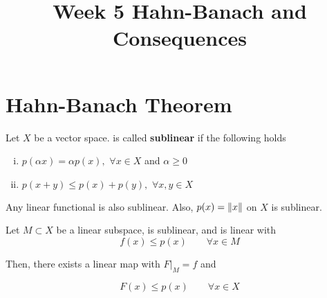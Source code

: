 \documentclass{article}
\title{Week 5 Hahn-Banach and Consequences}
\begin{document}
\author{\aut}
\maketitle

\section{Hahn-Banach Theorem} 

\begin{definition}\nl
\label{sublinear map}
	Let $X$ be a vector space.  is called \textbf{sublinear} if the following holds
	\begin{enumerate}[i)]
		\item $p( \alpha x)= \alpha p(x),$ $\forall x\in X$ and $\alpha\geq0$
		\item $p(x+y) \leq p(x)+p(y),\,\,\forall x,y\in X$
	\end{enumerate}
\end{definition}

\begin{example}
    Any linear functional is also sublinear. Also, $p(x)=\left\|{x}\right\|$ on $X$ is sublinear.
\end{example}  

\begin{theorem}\nl
\label{Hahn-Banach}
	Let $M\subset X$ be a linear subspace,  is sublinear, and  is linear with 
	\begin{equation*}
	    f(x)\leq p(x) \qquad \forall x\in M
     \tag{$*$}
	\end{equation*}

	Then, there exists a linear map  with $F|_M=f$ and
	
	$$F(x)\leq p(x) \qquad \forall x\in X$$
\end{theorem}
\end{document}
